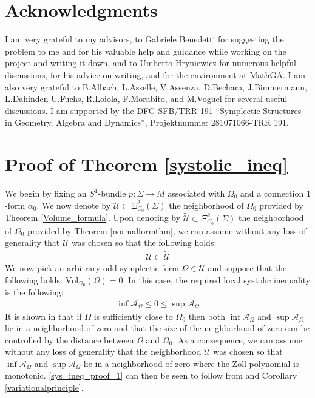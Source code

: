 \documentclass[11pt]{amsart}
\theoremstyle{plain}
\theoremstyle{definition}
\theoremstyle{remark}
\begin{document}
\section*{Acknowledgments}
I am very grateful to my advisors, to Gabriele Benedetti for suggesting the problem to me and for his valuable help and guidance while working on the project and writing it down, and to Umberto Hryniewicz for numerous helpful discussions, for his advice on writing, and for the environment at MathGA. I am also very grateful to B.Albach, L.Asselle, V.Assenza, D.Bechara, J.Bimmermann, L.Dahinden U.Fuchs, R.Loiola, F.Morabito, and M.Voguel for several useful discussions. I am supported by the DFG SFB/TRR 191 “Symplectic Structures in Geometry,
Algebra and Dynamics”, Projektnummer 281071066-TRR 191.
\section{Proof of Theorem \ref{systolic_ineq}}\label{Proof_of_main_thm}
We begin by fixing an $S^1$-bundle $p: \Sigma \rightarrow M$ associated with $\Omega_0$ and a connection $1$-form $\alpha_0$. We now denote by $\mathcal{U} \subset \Xi^2_{C_0}(\Sigma)$ the neighborhood of $\Omega_0$ provided by Theorem \ref{Volume_formula}. Upon denoting by $\tilde{\mathcal{U}} \subset \Xi^2_{C_0}(\Sigma)$ the neighborhood of $\Omega_0$ provided by Theorem \ref{normalformthm}, we can assume without any loss of generality that $\mathcal{U}$ was chosen so that the following holds:
\begin{align}
   \mathcal{U} \subset \tilde{\mathcal{U}}
\end{align}
We now pick an arbitrary odd-symplectic form $\Omega \in \mathcal{U}$ and suppose that the following holds: $\text{Vol}_{\Omega_0}(\Omega) =0$. In this case, the required local systolic inequality is the following:
\begin{align}\label{sys_ineq_proof_1}
    \inf \mathcal{A}_{\Omega} \leq 0 \leq \sup\mathcal{A}_{\Omega}
\end{align}
It is shown in \cite[Proposition 7.4]{B-K-Odd_Symp} that if $\Omega$ is sufficiently close to $\Omega_0$ then both $\inf \mathcal{A}_{\Omega}$ and $\sup\mathcal{A}_{\Omega}$ lie in a neighborhood of zero and that the size of the neighborhood of zero can be controlled by the distance between $\Omega$ and $\Omega_0$. As a consequence, we can assume without any loss of generality that the neighborhood $\mathcal{U}$ was chosen so that $\inf \mathcal{A}_{\Omega}$ and $\sup\mathcal{A}_{\Omega}$ lie in a neighborhood of zero where the Zoll polynomial is monotonic. \eqref{sys_ineq_proof_1} can then be seen to follow from \cite[Proposition 7.4]{B-K-Odd_Symp} and Corollary \ref{variationalprinciple}.\\
\end{document}
